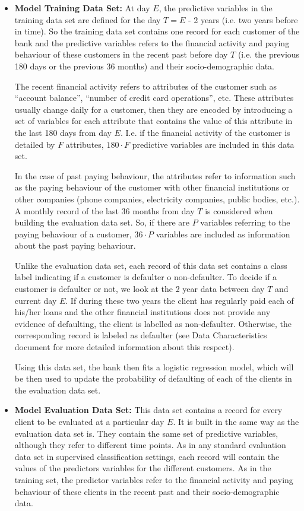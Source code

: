 \begin{itemize}

\item \textbf{Model Training Data Set:}  At day $E$, the predictive variables in the training data set are defined for the day $T = E$ - 2 years (i.e. two years before in time). So the training data set contains one record for each customer of the bank and the predictive variables refers to the financial activity and paying behaviour of these customers in the recent past before day $T$ (i.e. the previous 180 days or the previous 36 months) and their socio-demographic data. 

The recent financial activity refers to attributes of the customer such as ``account balance'', ``number of credit card operations'', etc. These attributes usually change daily for a customer, then they are encoded by introducing a set of variables for each attribute that contains the value of this attribute in the last 180 days from day $E$. I.e. if the financial activity of the customer is detailed by $F$ attributes,  $180\cdot F$ predictive variables are included in this data set.

In the case of past paying behaviour, the attributes refer to information such as the paying behaviour of the customer with other financial institutions or other companies (phone companies, electricity companies, public bodies, etc.). A monthly record of the last 36 months from day $T$ is considered when building the evaluation data set. So, if there are $P$ variables referring to the paying behaviour of a customer, $36\cdot P$ variables are included as information about the past paying behaviour.  

Unlike the evaluation data set, each record of this data set contains a class label indicating if a customer is defaulter o non-defaulter. To decide if a customer is defaulter or not, we look at the 2 year data between day $T$ and current day $E$. If during these two years the client has regularly paid each of his/her loans and the other financial institutions does not provide any evidence of defaulting, the client is labelled as non-defaulter. Otherwise, the corresponding record is labeled as defaulter (see Data Characteristics document for more detailed information about this respect).   

Using this data set, the bank then fits a logistic regression model, which will be then used to update the probability of defaulting of each of the clients in the evaluation data set.  

\item \textbf{Model Evaluation Data Set:} This data set contains a record for every client to be evaluated at a particular day $E$. It is built in the same way as the evaluation data set is. They contain the same set of predictive variables, although they refer to different time points.  As in any standard evaluation data set in supervised classification settings, each record will contain the values of the predictors variables for the different customers. As in the training set, the predictor variables refer to the financial activity and paying behaviour of these clients in the recent past and their socio-demographic data. 



\end{itemize}
